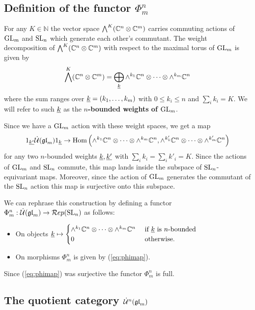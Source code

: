 \documentclass[10pt,leqno]{article}
\begin{document}
\subsection{Definition of the functor $\Phi_m^n$}
For any $K \in {\mathbb{N}}$ the vector space $\bigwedge^K(\mathbb C^n \otimes \mathbb C^m)$ carries commuting actions of ${\rm{GL}}_m $ and ${\rm{SL}}_n$ which generate each other's commutant. The weight decomposition of $\bigwedge^K(\mathbb C^n \otimes \mathbb C^m)$ with respect to the maximal torus of $ {\rm{GL}}_m $ is given by 
\begin{equation}
 \bigwedge^K(\mathbb C^n \otimes \mathbb C^m) = \bigoplus_{{\underline{k}}} \wedge^{k_1} \mathbb C^n \otimes \cdots \otimes \wedge^{k_m} \mathbb C^n
 \end{equation}
where the sum ranges over ${\underline{k}} = (k_1, \dots, k_m)$ with $ 0 \le k_i \le n $ and $\sum_i k_i = K$. We will refer to such ${\underline{k}}$ as the {\bf $n$-bounded weights of ${\rm{GL}}_m$}.

Since we have a ${\rm{GL}}_m$ action with these weight spaces, we get a map
\begin{equation}\label{eq:phimap}
1_{\underline{k'}} \dot{{\mathcal{U}}}({\mathfrak{gl}}_m) 1_{\underline{k}} \rightarrow \operatorname{Hom} \left(\wedge^{k_1} \mathbb C^n \otimes \cdots \otimes \wedge^{k_m} \mathbb C^n, \wedge^{k'_1} \mathbb C^n \otimes \cdots \otimes \wedge^{k'_m} \mathbb C^n\right)
\end{equation}
for any two $n$-bounded weights ${\underline{k}}, {\underline{k'}}$ with $\sum_i k_i = \sum_i k'_i = K$. Since the actions of ${\rm{GL}}_m $ and ${\rm{SL}}_n$ commute, this map lands inside the subspace of ${\rm{SL}}_n$-equivariant maps. Moreover, since the action of ${\rm{GL}}_m$ generates the commutant of the ${\rm{SL}}_n$ action this map is surjective onto this subspace.

We can rephrase this construction by defining a functor $\Phi_m^n : \dot{{\mathcal{U}}}({\mathfrak{gl}}_m) \rightarrow \mathcal{R}ep({\rm{SL}}_n)$ as follows:
\begin{itemize}
\item On objects 
${\underline{k}} \mapsto 
\begin{cases} 
\wedge^{k_1} \mathbb C^n \otimes \cdots \otimes \wedge^{k_m} \mathbb C^n & \text{ if } {\underline{k}} \text{ is } n\text{-bounded } \\
0 & \text{ otherwise.}
\end{cases}$ 
\item On morphisms $ \Phi_m^n $ is given by (\ref{eq:phimap}). 
\end{itemize}
Since (\ref{eq:phimap}) was surjective the functor $\Phi_m^n$ is full.

\subsection{The quotient category $\dot{{\mathcal{U}}}^n({\mathfrak{gl}}_m)$}
\end{document}
